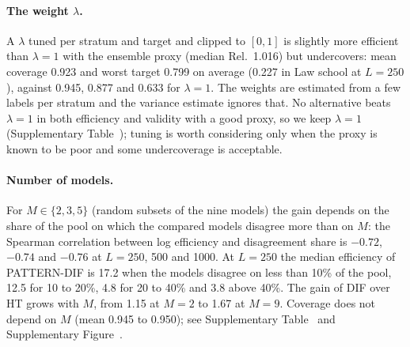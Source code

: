 \paragraph{The weight $\lambda$.} A $\lambda$ tuned per stratum and target and clipped to $[0,1]$ \citep[as in PPI++ and StratPPI;][]{angelopoulos2026ppipp,fisch2024stratppi} is slightly more efficient than $\lambda=1$ with the ensemble proxy (median Rel.\ 1.016) but undercovers: mean coverage 0.923 and worst target 0.799 on average (0.227 in Law school at $L=250$), against 0.945, 0.877 and 0.633 for $\lambda=1$. The weights are estimated from a few labels per stratum and the variance estimate ignores that. No alternative beats $\lambda=1$ in both efficiency and validity with a good proxy, so we keep $\lambda=1$ (Supplementary Table~); tuning is worth considering only when the proxy is known to be poor and some undercoverage is acceptable.

\paragraph{Number of models.} For $M\in\{2,3,5\}$ (random subsets of the nine models) the gain depends on the share of the pool on which the compared models disagree more than on $M$: the Spearman correlation between log efficiency and disagreement share is $-0.72$, $-0.74$ and $-0.76$ at $L=250$, 500 and 1000. At $L=250$ the median efficiency of PATTERN-DIF is 17.2 when the models disagree on less than 10\% of the pool, 12.5 for 10 to 20\%, 4.8 for 20 to 40\% and 3.8 above 40\%. The gain of DIF over HT grows with $M$, from 1.15 at $M=2$ to 1.67 at $M=9$. Coverage does not depend on $M$ (mean 0.945 to 0.950); see Supplementary Table~ and Supplementary Figure~.

\begin{table}[t]
\centering\footnotesize
\setlength{\tabcolsep}{4pt}
\caption{Small-sample inference for PATTERN-DIF (A4). Mean: mean over cells and targets; worst: mean over cells of the worst-target coverage; min: minimum over cells of the worst-target coverage. Small pools: Churn, Spambase, Phoneme, Law school. Width: average interval width relative to Wald over all 29 cells. Floors: 'zero' replaces a zero stratum variance by the proxy residual variance, 'max' uses the larger of the two in every stratum.}
\label{tab:abl-inference}

\end{table}

